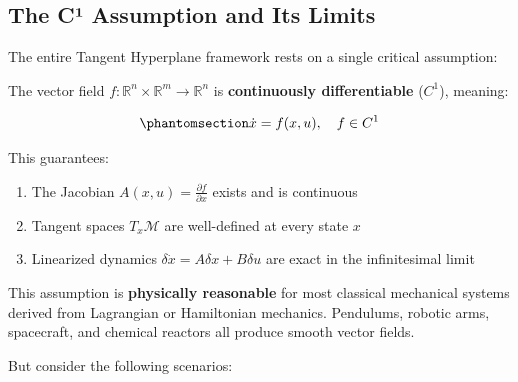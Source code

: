 \documentclass[
  letterpaper,
  DIV=11,
  numbers=noendperiod]{scrartcl}
\providecommand{\tightlist}{%
  \setlength{\itemsep}{0pt}\setlength{\parskip}{0pt}}\usepackage{longtable,booktabs,array}
\begin{document}
\subsection{The C¹ Assumption and Its
Limits}\label{the-cuxb9-assumption-and-its-limits}

The entire Tangent Hyperplane framework rests on a single critical
assumption:

\begin{tcolorbox}[enhanced jigsaw, coltitle=black, titlerule=0mm, toprule=.15mm, opacitybacktitle=0.6, left=2mm, opacityback=0, rightrule=.15mm, leftrule=.75mm, breakable, colframe=quarto-callout-important-color-frame, bottomtitle=1mm, toptitle=1mm, arc=.35mm, title=\textcolor{quarto-callout-important-color}{\faExclamation}\hspace{0.5em}{Smoothness Requirement (Main Thesis)}, bottomrule=.15mm, colback=white, colbacktitle=quarto-callout-important-color!10!white]

The vector field
\(f: \mathbb{R}^n \times \mathbb{R}^m \to \mathbb{R}^n\) is
\textbf{continuously differentiable} (\(C^1\)), meaning:

\begin{equation}\phantomsection\label{eq-smooth-dynamics}{
\dot{x} = f(x, u), \quad f \in C^1
}\end{equation}

This guarantees:

\begin{enumerate}
\def\labelenumi{\arabic{enumi}.}
\tightlist
\item
  The Jacobian \(A(x,u) = \frac{\partial f}{\partial x}\) exists and is
  continuous
\item
  Tangent spaces \(T_x \mathcal{M}\) are well-defined at every state
  \(x\)
\item
  Linearized dynamics \(\delta\dot{x} = A\delta x + B\delta u\) are
  exact in the infinitesimal limit
\end{enumerate}

\end{tcolorbox}

This assumption is \textbf{physically reasonable} for most classical
mechanical systems derived from Lagrangian or Hamiltonian mechanics.
Pendulums, robotic arms, spacecraft, and chemical reactors all produce
smooth vector fields.

But consider the following scenarios:
\end{document}
